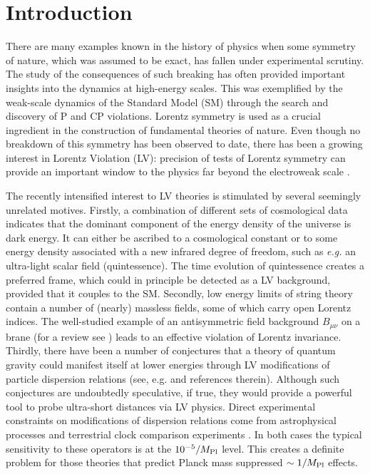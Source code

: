 \documentclass[12pt]{revtex4}
\begin{document}
\begin{titlepage}
\end{titlepage}


\newpage

\setcounter{footnote}{0}
\setcounter{equation}{0}


\section{Introduction}
\label{Intro}


There are many examples known in the history of physics when some
symmetry of nature, which was assumed to be exact, has fallen under
experimental scrutiny. The study of the consequences of such breaking
has often provided important insights into the dynamics at
high-energy scales. This was exemplified by the weak-scale dynamics of
the Standard Model (SM) through the search and discovery of P and CP 
violations. Lorentz symmetry is used as a crucial ingredient in the
construction of fundamental theories of nature. Even though no
breakdown of this symmetry has been observed to date, there has been a
growing interest in Lorentz Violation (LV): precision of 
tests of Lorentz symmetry can provide an important window to the
physics far beyond the electroweak scale
\cite{Kost1,CG,Jacobsonreview,PhysToday,Sigl:2004cq,Mattingly:2005re}. 


The recently intensified interest to LV theories is stimulated by
several seemingly unrelated motives. Firstly, a combination of different sets of 
cosmological data indicates that the dominant component of the energy
density of the universe is dark energy. It can either be ascribed
to a cosmological constant or to some energy density associated with a
new infrared degree of freedom, such as {\em e.g.} an ultra-light
scalar field (quintessence). The time evolution of quintessence
creates a preferred frame, which could in principle be detected as a
LV background, provided that it couples to the SM. Secondly, low energy
limits of string theory contain a number of (nearly) massless fields,
some of which carry open Lorentz indices. The well-studied 
example of an antisymmetric field background $B_{\mu\nu}$ on a brane
(for a review see \cite{DN}) leads to an effective violation of Lorentz
invariance. Thirdly, there have been a number of conjectures that a
theory of quantum gravity could manifest itself at lower energies
through LV modifications of particle dispersion relations 
(see, e.g. \cite{lcq,Vucetich:2005ra} and references therein). Although such
conjectures are undoubtedly speculative, if true, they would provide a
powerful tool to probe ultra-short distances via LV physics.  Direct
experimental constraints on modifications of dispersion relations come
from astrophysical processes \cite{CFJ,AmC,Ted1,GK,Kost2,Sarkar} and
terrestrial clock comparison experiments \cite{clock1,clock2,Vuc,MP:}. 
In both cases the typical sensitivity to these operators is at the
$10^{-5}/M_{\rm Pl}$ level. This creates a definite problem for those
theories that predict Planck mass suppressed $\sim 1/M_{\rm Pl}$
effects. 
\end{document}

